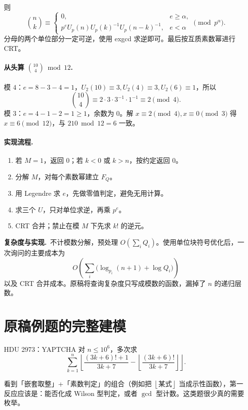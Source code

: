 \documentclass[UTF8,a4paper,11pt,twoside,openright,fontset=fandol]{ctexbook}
\theoremstyle{definition}
\newcommand{\floor}[1]{\left\lfloor #1\right\rfloor}
\newcommand{\cost}{\par\noindent\textbf{复杂度与实现.}\ }
\begin{document}
则
\[
\binom nk\equiv
\begin{cases}
0,&e\ge\alpha,\\
p^eU_p(n)U_p(k)^{-1}U_p(n-k)^{-1},&e<\alpha
\end{cases}\pmod{p^\alpha}.
\]
分母的两个单位部分一定可逆，使用 exgcd 求逆即可。最后按互质素数幂进行 CRT。


\paragraph{从头算 $\binom{10}{4}\bmod12$.}
模 $4$：$e=8-3-4=1$，$U_2(10)\equiv3,U_2(4)\equiv3,U_2(6)\equiv1$，所以
\[
 \binom{10}{4}\equiv2\cdot3\cdot3^{-1}\cdot1^{-1}\equiv2\pmod4.
\]
模 $3$：$e=4-1-2=1\ge1$，余数为 $0$。解 $x\equiv2\pmod4,x\equiv0\pmod3$ 得 $x\equiv6\pmod{12}$，与 $210\bmod12=6$ 一致。

\paragraph{实现流程.}
\begin{enumerate}
\item 若 $M=1$，返回 $0$；若 $k<0$ 或 $k>n$，按约定返回 $0$。
\item 分解 $M$，对每个素数幂建立 $F_Q$。
\item 用 Legendre 求 $e$，先做零值判定，避免无用计算。
\item 求三个 $U$，只对单位求逆，再乘 $p^e$。
\item CRT 合并；禁止在模 $M$ 下先求 $k!$ 的逆元。
\end{enumerate}
\cost 不计模数分解，预处理 $O(\sum_iQ_i)$。使用单位块符号优化后，一次询问的主要成本为
\[
O\!\left(\sum_i\bigl(\log_{p_i}(n+1)+\log Q_i\bigr)\right)
\]
以及 CRT 合并成本。原稿将查询复杂度只写成模数的函数，漏掉了 $n$ 的递归层数。


\section{原稿例题的完整建模}
\begin{problem}{HDU 2973：YAPTCHA}
对 $n\le10^6$，多次求
\[
\sum_{k=1}^n\floor{\frac{(3k+6)!+1}{3k+7}-\floor{\frac{(3k+6)!}{3k+7}}}.
\]
\end{problem}

\begin{tip}
看到「嵌套取整」+「素数判定」的组合（例如把 $\floor{\text{某式}}$ 当成示性函数），第一反应应该是：能否化成 Wilson 型判定，或者 $\gcd$ 型计数。这类题很少真的需要枚举。
\end{tip}
\end{document}
